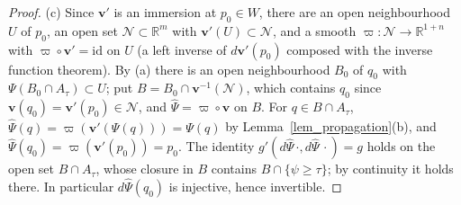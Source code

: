 \documentclass[11pt,a4paper,reqno]{amsart}
\theoremstyle{definition}
\numberwithin{equation}{section}
\newcommand{\R}{\mathbb{R}}
\newcommand{\cN}{\mathcal{N}}
\newcommand{\id}{\mathrm{id}}
\begin{document}
\begin{proof}
(c) Since $\mathbf v'$ is an immersion at $p_0\in W$, there are an open neighbourhood $U$ of $p_0$, an open set
$\cN\subset\R^m$ with $\mathbf v'(U)\subset\cN$, and a smooth $\varpi\colon\cN\to\R^{1+n}$ with $\varpi\circ\mathbf v'=\id$
on $U$ (a left inverse of $d\mathbf v'(p_0)$ composed with the inverse function theorem). By (a) there is an open
neighbourhood $B_0$ of $q_0$ with $\Psi(B_0\cap A_\tau)\subset U$; put $B=B_0\cap\mathbf v^{-1}(\cN)$, which contains $q_0$
since $\mathbf v(q_0)=\mathbf v'(p_0)\in\cN$, and $\hat\Psi=\varpi\circ\mathbf v$ on $B$. For $q\in B\cap A_\tau$,
$\hat\Psi(q)=\varpi(\mathbf v'(\Psi(q)))=\Psi(q)$ by Lemma~\ref{lem_propagation}(b), and
$\hat\Psi(q_0)=\varpi(\mathbf v'(p_0))=p_0$. The identity $g'(d\hat\Psi\,\cdot,d\hat\Psi\,\cdot)=g$ holds on the open set
$B\cap A_\tau$, whose closure in $B$ contains $B\cap\{\psi\ge\tau\}$; by continuity it holds there. In particular
$d\hat\Psi(q_0)$ is injective, hence invertible.
\end{proof}
\end{document}
